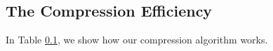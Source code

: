 \subsection{The Compression Efficiency}
In Table \ref{}, we show how our compression algorithm works. 

\begin{comment}
\subsection{Transmitted Data Size}
During transmissions of the Happy Buddha model (542652 vertex splits) using 
the receiver-driven protocol, 1.83 MBytes are sent from the receiver
to the sender as vertex split IDs, and 2.21 MBytes are sent from the sender 
to the receiver as vertex splits. 
Thus, on average, IDs cost 27 bpv and vertex splits cost 32 bpv.
If sender-driven protocol is used, both IDs and 
vertex splits are sent from the sender to the receiver, so the total data 
sent by the sender are 4.04 MBytes. Thus, by moving IDs from the down-link to up-link, we reduce the outgoing bandwidth consumption of the sender by more than 40\%.

Reducing the outgoing data size also shortens the downloading time.
In the receiver-driven protocol, although the total transmitted size remains
the same, about 40\% of the data are now transmitted in the up-link of
the client.  On duplex links where up-link transmission can occur concurrently with down-link
transmission, the total transmission time reduces by about 40\% as well.
\subsection{Quality}


\end{comment}
